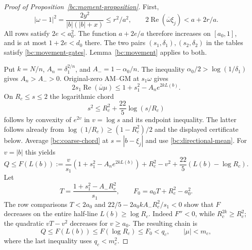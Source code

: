 \documentclass[11pt,reqno]{amsart}
\numberwithin{equation}{section}
\theoremstyle{definition}
\theoremstyle{remark}
\renewcommand{\Re}{\operatorname{Re}}
\begin{document}
\begin{proof}[Proof of Proposition~\ref{bc:moment-proposition}]
First,
\[
 |\omega-1|^2=\frac{2y^2}{|b|(|b|+x)}\leq r^2/a^2,
 \qquad
 2\Re(\overline\omega\xi_j)<a+2r/a.
\]
All rows satisfy $2e<a_0^2$.  The function $a+2e/a$ therefore
increases on $[a_0,1]$, and is at most $1+2e<d_0$ there.
The two pairs $(s_1,\delta_1),(s_2,\delta_2)$ in the tables satisfy
\eqref{bc:movement-gates}.  Lemma~\ref{bc:movement} applies to both.

Put $k=N/n$, $A_n=\delta_1^{2/n}$, and
$A_-=1-\alpha_0/n$.  The inequality
$\alpha_0/2>\log(1/\delta_1)$ gives $A_n>A_->0$.
Original-zero AM--GM at $s_1\omega$ gives
\begin{equation}\label{bc:directional-mean}
 2s_1\Re(\overline\omega\mu)
 \leq1+s_1^2-A_n e^{2kL(b)}.
\end{equation}
On $R_c\leq s\leq2$ the logarithmic chord
\begin{equation}\label{bc:coarse-chord}
 s^2\leq R_c^2+\frac{22}5\log(s/R_c)
\end{equation}
follows by convexity of $e^{2v}$ in $v=\log s$ and its endpoint
inequality.  The latter follows already from
$\log(1/R_c)\geq(1-R_c^2)/2$ and the displayed certificate below.
Average \eqref{bc:coarse-chord} at $s=|b-\xi_j|$ and use
\eqref{bc:directional-mean}.  For $v=|b|$ this yields
\begin{equation}\label{bc:F-definition}
 Q\leq F(L(b)):=
 \frac v{s_1}(1+s_1^2-A_ne^{2kL(b)})+R_c^2-v^2
     +\frac{22}5(L(b)-\log R_c).
\end{equation}
Let
\[
 T=\frac{1+s_1^2-A_-R_c^2}{s_1},\qquad
 F_0=a_0T+R_c^2-a_0^2.
\]
The row comparisons $T<2a_0$ and
$22/5-2a_0kA_-R_c^2/s_1<0$ show that $F$ decreases on the
entire half-line $L(b)\geq\log R_c$.  Indeed $F''<0$, while
$R_c^{2k}\geq R_c^2$; the quadratic $vT-v^2$ decreases for
$v\geq a_0$.  The resulting chain is
\begin{equation}\label{bc:coarse-correct-chain}
 Q\leq F(L(b))\leq F(\log R_c)\leq F_0<q_c,
 \qquad |\mu|<m_c,
\end{equation}
where the last inequality uses $q_c<m_c^2$.


\end{proof}
\end{document}
